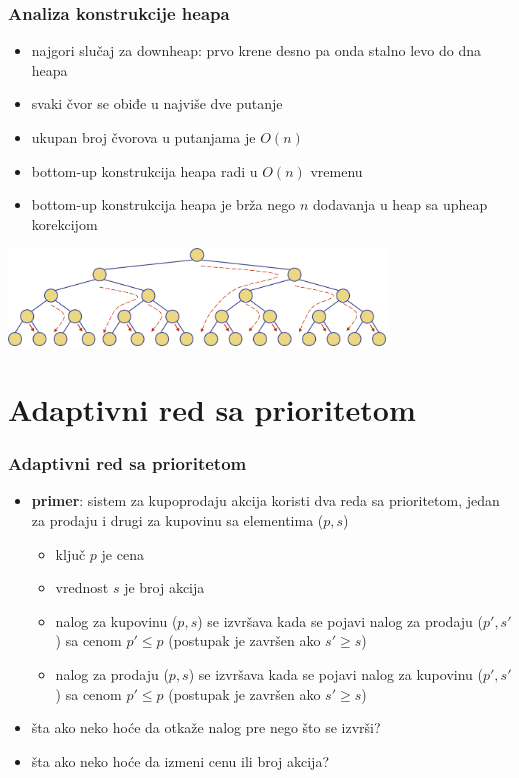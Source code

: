 \documentclass[compress,aspectratio=169]{beamer}
\begin{document}
\begin{frame}[fragile]
  \frametitle{Analiza konstrukcije heapa}
  \begin{itemize}
    \item najgori slučaj za downheap: prvo krene desno pa onda stalno levo do
    dna heapa
    \item svaki čvor se obiđe u najviše dve putanje
    \item ukupan broj čvorova u putanjama je $O(n)$
    \item bottom-up konstrukcija heapa radi u $O(n)$ vremenu
    \item bottom-up konstrukcija heapa je brža nego $n$ dodavanja u heap sa upheap korekcijom
  \end{itemize}
  \begin{center}
    \includegraphics[width=10cm]{asp-09-pic18.png}
  \end{center}
\end{frame}

\section[Adaptivni RSP]{Adaptivni red sa prioritetom}
\begin{frame}[fragile]
  \frametitle{Adaptivni red sa prioritetom}
  \begin{itemize}
    \item \textbf{primer}: sistem za kupoprodaju akcija koristi dva reda sa
    prioritetom, jedan za prodaju i drugi za kupovinu sa elementima ($p, s$)
    \begin{itemize}
      \item ključ $p$ je cena
      \item vrednost $s$ je broj akcija
      \item nalog za kupovinu ($p, s$) se izvršava kada se pojavi nalog za
      prodaju ($p', s'$) sa cenom $p'\leq p$ (postupak je završen ako $s'\geq
      s$)
      \item nalog za prodaju ($p, s$) se izvršava kada se pojavi nalog za
      kupovinu ($p', s'$) sa cenom $p'\leq p$ (postupak je završen ako $s'\geq
      s$)
    \end{itemize}
    \item šta ako neko hoće da otkaže nalog pre nego što se izvrši?
    \item šta ako neko hoće da izmeni cenu ili broj akcija?
  \end{itemize}
\end{frame}
\end{document}
